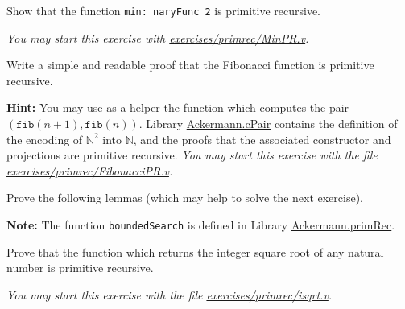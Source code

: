 \begin{exercise}
Show that the function \texttt{min: naryFunc\,2} is primitive
recursive.

\emph{You may start this exercise with
    \href{https://github.com/coq-community/hydra-battles/blob/master/exercises/primrec/MinPR.v}{exercises/primrec/MinPR.v}.}

\end{exercise}


\begin{exercise}
Write a simple and readable proof that the Fibonacci function is primitive recursive.




\textbf{Hint:}  You may use as a helper the function which computes the pair \linebreak
$(\texttt{fib}(n+1),\texttt{fib}(n))$. 
Library \href{../theories/html/hydras.Ackermann.cPair.html}{Ackermann.cPair} contains
the definition of the encoding of $\mathbb{N}^2$ into $\mathbb{N}$, and the proofs that 
the associated constructor and projections are primitive recursive.
\emph{You may start this exercise with the file
    \href{https://github.com/coq-community/hydra-battles/blob/master/exercises/primrec/FibonacciPR.v}{exercises/primrec/FibonacciPR.v}.}

\end{exercise}

\begin{exercise}

Prove the following lemmas (which may help to solve the next  exercise).


\textbf{Note:}  The function \texttt{boundedSearch} is defined
in Library \href{../theories/html/hydras.Ackermann.primRec.html}{Ackermann.primRec}. 
\end{exercise}


\begin{exercise}
Prove that the function which returns the  integer square root of any natural number  is primitive recursive.

\emph{You may start this exercise with the file
    \href{https://github.com/coq-community/hydra-battles/blob/master/exercises/primrec/isqrt.v}{exercises/primrec/isqrt.v}.}

\end{exercise}

